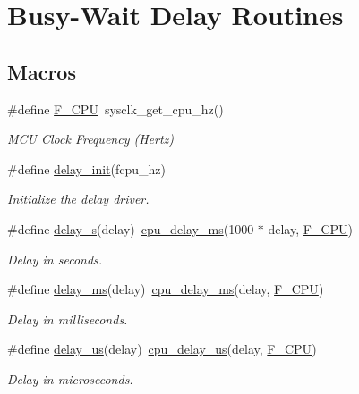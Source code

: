 \hypertarget{group__group__common__services__delay}{\section{Busy-\/\-Wait Delay Routines}
\label{group__group__common__services__delay}
}
\subsection*{Macros}
\begin{DoxyCompactItemize}
\item 
\#define \hyperlink{group__group__common__services__delay_ga43bafb28b29491ec7f871319b5a3b2f8}{F\-\_\-\-C\-P\-U}~sysclk\-\_\-get\-\_\-cpu\-\_\-hz()
\begin{DoxyCompactList}\small\item\em M\-C\-U Clock Frequency (Hertz) \end{DoxyCompactList}\item 
\#define \hyperlink{group__group__common__services__delay_ga62d461b94db6352d8ed8442d62ea39fb}{delay\-\_\-init}(fcpu\-\_\-hz)
\begin{DoxyCompactList}\small\item\em Initialize the delay driver. \end{DoxyCompactList}\item 
\#define \hyperlink{group__group__common__services__delay_gafdccadc6c16847907b3252cdef83e8b0}{delay\-\_\-s}(delay)~\hyperlink{cycle__counter_8h_a2b733c4de847b6d4e6d5ba466f21da52}{cpu\-\_\-delay\-\_\-ms}(1000 $\ast$ delay, \hyperlink{group__group__common__services__delay_ga43bafb28b29491ec7f871319b5a3b2f8}{F\-\_\-\-C\-P\-U})
\begin{DoxyCompactList}\small\item\em Delay in seconds. \end{DoxyCompactList}\item 
\#define \hyperlink{group__group__common__services__delay_gad917a5d772ddbd99ad97a1c999ce40d4}{delay\-\_\-ms}(delay)~\hyperlink{cycle__counter_8h_a2b733c4de847b6d4e6d5ba466f21da52}{cpu\-\_\-delay\-\_\-ms}(delay, \hyperlink{group__group__common__services__delay_ga43bafb28b29491ec7f871319b5a3b2f8}{F\-\_\-\-C\-P\-U})
\begin{DoxyCompactList}\small\item\em Delay in milliseconds. \end{DoxyCompactList}\item 
\#define \hyperlink{group__group__common__services__delay_gaf9a0c0e0f880d818a4c2c3ea9fe8cba1}{delay\-\_\-us}(delay)~\hyperlink{cycle__counter_8h_a1f5289578e4f08b99cfca749dcaca964}{cpu\-\_\-delay\-\_\-us}(delay, \hyperlink{group__group__common__services__delay_ga43bafb28b29491ec7f871319b5a3b2f8}{F\-\_\-\-C\-P\-U})
\begin{DoxyCompactList}\small\item\em Delay in microseconds. \end{DoxyCompactList}\end{DoxyCompactItemize}


